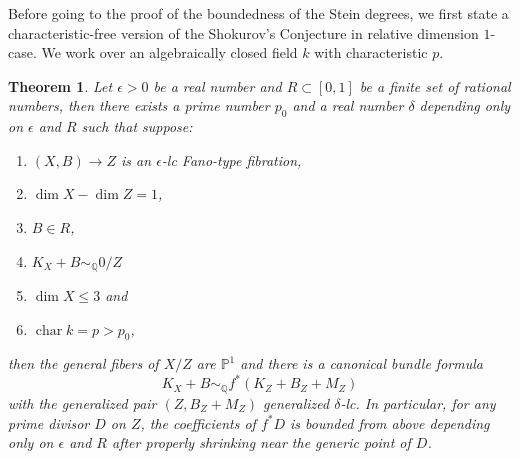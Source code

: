 \documentclass[letterpaper,reqno,12pt]{amsart}
\DeclareMathOperator{\chara}{char}
\numberwithin{equation}{section}
\theoremstyle{plain}
\newtheorem{theorem}{Theorem}[section]
\begin{document}
Before going to the proof of the boundedness of the Stein degrees, we first state a characteristic-free version of the Shokurov's Conjecture in relative dimension $1$-case. We work over an algebraically closed field $k$ with characteristic $p$.
\begin{theorem}\label{mult1}
    Let $\epsilon>0$ be a real number and $R\subset [0,1]$ be a finite set of rational numbers, then there exists a prime number $p_0$ and a real number $\delta$ depending only on $\epsilon$ and $R$ such that suppose:
    \begin{enumerate}
        \item $(X,B)\to Z$ is an $\epsilon$-lc Fano-type fibration,
        \item $\dim X-\dim Z=1$,
        \item $B\in R$,
        \item $K_X+B\sim_\mathbb Q 0/Z$
        \item $\dim X\leq 3$ and
        \item $\chara k=p>p_0$,
    \end{enumerate} then the general fibers of $X/Z$ are $\mathbb P^1$ and there is a canonical bundle formula 
    \[K_X+B\sim_\mathbb Q f^*(K_Z+B_Z+M_Z)\]
    with the generalized pair $(Z,B_Z+M_Z)$ generalized $\delta$-lc. In particular, for any prime divisor $D$ on $Z$, the coefficients of $f^*D$ is bounded from above depending only on $\epsilon$ and $R$ after properly shrinking near the generic point of $D$.
\end{theorem}
\end{document}
